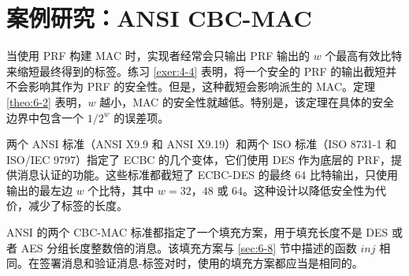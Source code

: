 \section{案例研究：ANSI CBC-MAC}\label{sec:6-9}

当使用 PRF 构建 MAC 时，实现者经常会只输出 PRF 输出的 $w$ 个最高有效比特来缩短最终得到的标签。练习 \ref{exer:4-4} 表明，将一个安全的 PRF 的输出截短并不会影响其作为 PRF 的安全性。但是，这种截短会影响派生的 MAC。定理 \ref{theo:6-2} 表明，$w$ 越小，MAC 的安全性就越低。特别是，该定理在具体的安全边界中包含一个 $1/2^w$ 的误差项。

两个 ANSI 标准（ANSI X9.9 和 ANSI X9.19）和两个 ISO 标准（ISO 8731-1 和 ISO/IEC 9797）指定了 ECBC 的几个变体，它们使用 DES 作为底层的 PRF，提供消息认证的功能。这些标准都截短了 ECBC-DES 的最终 $64$ 比特输出，只使用输出的最左边 $w$ 个比特，其中 $w=32$，$48$ 或 $64$。这种设计以降低安全性为代价，减少了标签的长度。

ANSI 的两个 CBC-MAC 标准都指定了一个填充方案，用于填充长度不是 DES 或者 AES 分组长度整数倍的消息。该填充方案与 \ref{sec:6-8} 节中描述的函数 $inj$ 相同。在签署消息和验证消息-标签对时，使用的填充方案都应当是相同的。